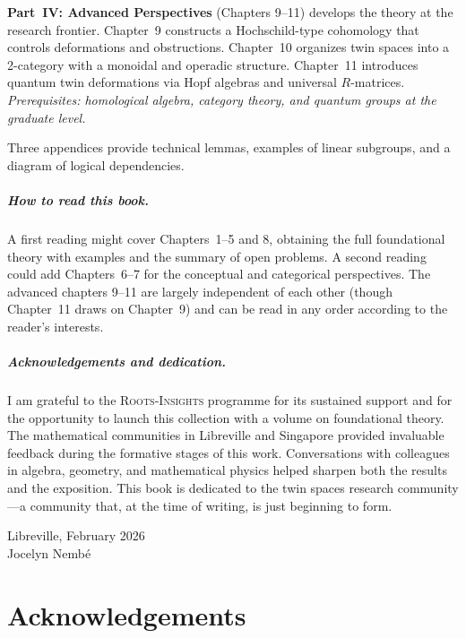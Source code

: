 \documentclass[11pt,a4paper,openany]{book}
\theoremstyle{plain}
\theoremstyle{definition}
\begin{document}
\textbf{Part~IV: Advanced Perspectives} (Chapters 9--11) develops the theory at the research frontier. Chapter~9 constructs a Hochschild-type cohomology that controls deformations and obstructions. Chapter~10 organizes twin spaces into a 2-category with a monoidal and operadic structure. Chapter~11 introduces quantum twin deformations via Hopf algebras and universal $R$-matrices. \textit{Prerequisites: homological algebra, category theory, and quantum groups at the graduate level.}

Three appendices provide technical lemmas, examples of linear subgroups, and a diagram of logical dependencies.

\paragraph{How to read this book.} A first reading might cover Chapters~1--5 and 8, obtaining the full foundational theory with examples and the summary of open problems. A second reading could add Chapters~6--7 for the conceptual and categorical perspectives. The advanced chapters 9--11 are largely independent of each other (though Chapter~11 draws on Chapter~9) and can be read in any order according to the reader's interests.

\paragraph{Acknowledgements and dedication.}
I am grateful to the \textsc{Roots-Insights} programme for its sustained support and for the opportunity to launch this collection with a volume on foundational theory. The mathematical communities in Libreville and Singapore provided invaluable feedback during the formative stages of this work. Conversations with colleagues in algebra, geometry, and mathematical physics helped sharpen both the results and the exposition. This book is dedicated to the twin spaces research community---a community that, at the time of writing, is just beginning to form.

\vspace{2em}
\begin{flushright}
Libreville, February 2026\\
Jocelyn Nemb\'e
\end{flushright}

\cleardoublepage

\chapter*{Acknowledgements}
\end{document}
